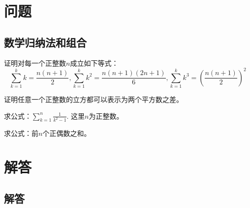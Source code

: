 \documentclass[cn,11pt,chinese]{elegantbook}
\numberwithin{equation}{section}
\begin{document}
\part{问题}

\chapter{数学归纳法和组合}\label{chapter002}
\begin{exercise}
证明对每一个正整数$n$成立如下等式：
\[
\sum_{k=1}^{k}{k} = \frac{n(n+1)}{2},\sum_{k=1}^{k}{k^2} = \frac{n(n+1)(2n+1)}{6},\sum_{k=1}^{k}{k^3} = \left(\frac{n(n+1)}{2}\right)^2
\]
\end{exercise}

\begin{exercise}
证明任意一个正整数的立方都可以表示为两个平方数之差。
\end{exercise}

\begin{exercise}
求公式：$\sum_{k=1}^{n}{\frac{1}{k^2-1}}$. 这里$n$为正整数。
\end{exercise}

\begin{exercise}
求公式：前$n$个正偶数之和。
\end{exercise}

\begin{exercise}

\end{exercise}

\begin{exercise}

\end{exercise}

\part{解答}
\chapter{解答}\label{chapter008}





% 

\appendix
\end{document}
